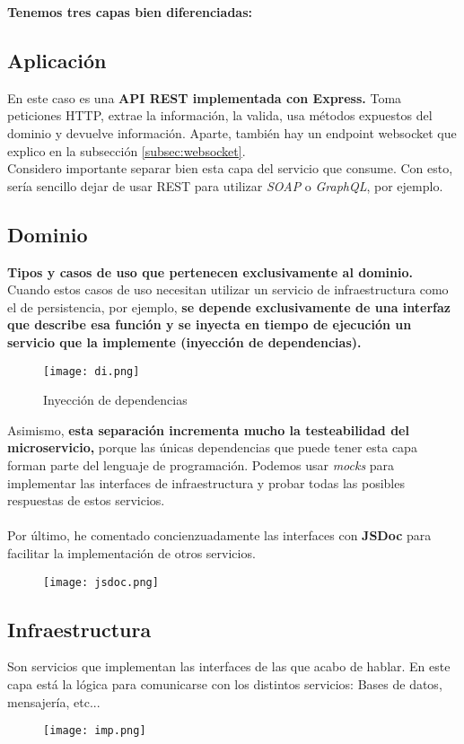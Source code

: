 \textbf{Tenemos tres capas bien diferenciadas:}


\subsection{Aplicación}
En este caso es una \textbf{API REST implementada con Express.} Toma peticiones HTTP, extrae la información, la valida, usa métodos expuestos del dominio y devuelve información.
Aparte, también hay un endpoint websocket que explico en la subsección \ref{subsec:websocket}. \\
Considero importante separar bien esta capa del servicio que consume. Con esto, sería sencillo dejar de usar 
REST para utilizar \textit{SOAP} o \textit{GraphQL}, por ejemplo.

\subsection{Dominio}
\textbf{Tipos y casos de uso que pertenecen exclusivamente al dominio.}
Cuando estos casos de uso necesitan utilizar un servicio de infraestructura como el de persistencia, por ejemplo,
\textbf{se depende exclusivamente de una interfaz que describe esa función y se inyecta en tiempo de ejecución un servicio que la implemente (inyección de dependencias).}
\begin{figure}[H]
	\centering	
	\texttt{[image: di.png]}
	\caption{Inyección de dependencias}
	\end{figure}

Asimismo, \textbf{esta separación incrementa mucho la testeabilidad del microservicio,} porque las únicas dependencias
que puede tener esta capa forman parte del lenguaje de programación. Podemos usar \textit{mocks} para implementar
las interfaces de infraestructura y probar todas las posibles respuestas de estos servicios. \\ \\
Por último, he comentado concienzuadamente las interfaces con \textbf{JSDoc} para facilitar la implementación de otros servicios.
\begin{figure}[H]
	\centering	
	\texttt{[image: jsdoc.png]}
	\end{figure}

\subsection{Infraestructura} 
Son servicios que implementan las interfaces de las que acabo de hablar.
En este capa está la lógica para comunicarse con los distintos servicios: Bases de datos, mensajería, etc...
\begin{figure}[H]
	\centering	
	\texttt{[image: imp.png]}
	\end{figure}


